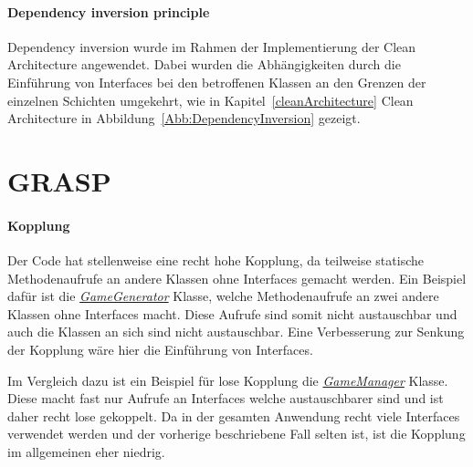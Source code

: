 \paragraph{Dependency inversion principle}
Dependency inversion wurde im Rahmen der Implementierung der Clean Architecture angewendet. Dabei wurden die Abhängigkeiten durch die Einführung von Interfaces bei den betroffenen Klassen an den Grenzen der einzelnen Schichten umgekehrt, wie in Kapitel~\ref{cleanArchitecture} Clean Architecture in Abbildung~\ref{Abb:DependencyInversion} gezeigt.

\section{GRASP}
\paragraph{Kopplung} 
Der Code hat stellenweise eine recht hohe Kopplung, da teilweise statische Methodenaufrufe an andere Klassen ohne Interfaces gemacht werden. Ein Beispiel dafür ist die \href{https://github.com/EinToni/Wortfinder/blob/main/Wortfinder/GameGenerator.cs}{\textit{GameGenerator}} Klasse, welche Methodenaufrufe an zwei andere Klassen ohne Interfaces macht. Diese Aufrufe sind somit nicht austauschbar und auch die Klassen an sich sind nicht austauschbar. Eine Verbesserung zur Senkung der Kopplung wäre hier die Einführung von Interfaces.


Im Vergleich dazu ist ein Beispiel für lose Kopplung die \href{https://github.com/EinToni/Wortfinder/blob/main/Wortfinder/GameManager.cs}{\textit{GameManager}} Klasse. Diese macht fast nur Aufrufe an Interfaces welche austauschbarer sind und ist daher recht lose gekoppelt. Da in der gesamten Anwendung recht viele Interfaces verwendet werden und der vorherige beschriebene Fall selten ist, ist die Kopplung im allgemeinen eher niedrig.

